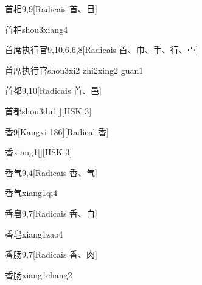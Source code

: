 \begin{entry}{首相}{9,9}[Radicais ⾸、⽬]
  \begin{phonetics}{首相}{shou3xiang4}
  \end{phonetics}
\end{entry}

\begin{entry}{首席执行官}{9,10,6,6,8}[Radicais ⾸、⼱、⼿、⾏、⼧]
  \begin{phonetics}{首席执行官}{shou3xi2 zhi2xing2 guan1}
  \end{phonetics}
\end{entry}

\begin{entry}{首都}{9,10}[Radicais ⾸、⾢]
  \begin{phonetics}{首都}{shou3du1}[][HSK 3]
  \end{phonetics}
\end{entry}

\begin{entry}{香}{9}[Kangxi 186][Radical ⾹]
  \begin{phonetics}{香}{xiang1}[][HSK 3]
  \end{phonetics}
\end{entry}

\begin{entry}{香气}{9,4}[Radicais ⾹、⽓]
  \begin{phonetics}{香气}{xiang1qi4}
  \end{phonetics}
\end{entry}

\begin{entry}{香皂}{9,7}[Radicais ⾹、⽩]
  \begin{phonetics}{香皂}{xiang1zao4}
  \end{phonetics}
\end{entry}

\begin{entry}{香肠}{9,7}[Radicais ⾹、⾁]
  \begin{phonetics}{香肠}{xiang1chang2}
  \end{phonetics}
\end{entry}


